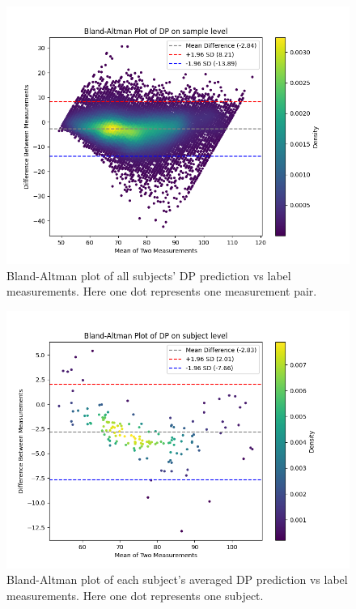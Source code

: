 \documentclass{article}
\begin{document}
\begin{figure}[H]
\centering
\includegraphics[width=\textwidth]{./Fig/Bland_Altman_Plot_DP_on_sample_level.png}
\caption{Bland-Altman plot of all subjects' DP prediction vs label measurements. Here one dot represents one measurement pair.}
\label{fig:image1}
\end{figure}

\begin{figure}[H]
\centering
\includegraphics[width=\textwidth]{./Fig/Bland_Altman_Plot_DP_on_subject_level.png}
\caption{Bland-Altman plot of each subject's averaged DP prediction vs label measurements. Here one dot represents one subject.}
\label{fig:image1}
\end{figure}
\end{document}
